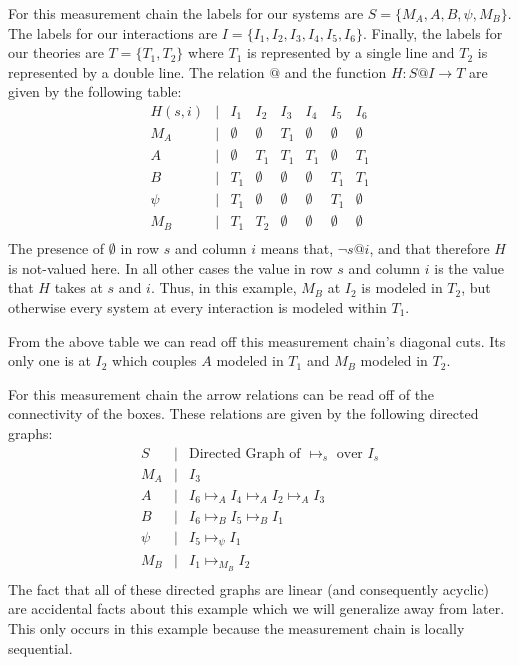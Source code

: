 \documentclass[12pt,prd,superscriptaddress,floatfix,amsmath,amssymb,amsfonts,nofootinbib]{revtex4-2}
\begin{document}
For this measurement chain the labels for our systems are $S=\{M_A,A,B,\psi,M_B\}$. The labels for our interactions are $I=\{I_1,I_2,I_3,I_4,I_5,I_6\}$. Finally, the labels for our theories are $T=\{T_1,T_2\}$ where $T_1$ is represented by a single line and $T_2$ is represented by a double line. The relation $@$ and the function $H:S@I\to T$ are given by the following table:
\[\begin{array}{cccccccc}
H(s,i) & \vert & I_1 & I_2 & I_3 & I_4 & I_5 & I_6\\
M_A & \vert & \emptyset & \emptyset & T_1 & \emptyset & \emptyset & \emptyset\\
A & \vert & \emptyset & T_1 & T_1 & T_1 & \emptyset & T_1\\
B & \vert & T_1 & \emptyset & \emptyset & \emptyset & T_1 & T_1\\
\psi & \vert & T_1 & \emptyset & \emptyset & \emptyset & T_1 & \emptyset\\
M_B & \vert & T_1 & T_2 & \emptyset & \emptyset & \emptyset & \emptyset\\
\end{array}\]
The presence of $\emptyset$ in row $s$ and column $i$ means that, $\neg s@i$, and that therefore $H$ is not-valued here. In all other cases the value in row $s$ and column $i$ is the value that $H$ takes at $s$ and $i$. Thus, in this example, $M_B$ at $I_2$ is modeled in $T_2$, but otherwise every system at every interaction is modeled within $T_1$.

From the above table we can read off this measurement chain's diagonal cuts. Its only one is at $I_2$ which couples $A$ modeled in $T_1$ and $M_B$ modeled in $T_2$.

For this measurement chain the arrow relations can be read off of the connectivity of the boxes. These relations are given by the following directed graphs:
\[\begin{array}{ccl}
S & \vert & \text{Directed Graph of }\mapsto_s\text{ over }I_s\\
M_A & \vert & I_3\\
A & \vert & I_6\mapsto_A I_4\mapsto_A I_2\mapsto_A I_3\\
B & \vert & I_6\mapsto_B I_5\mapsto_B I_1\\
\psi & \vert & I_5\mapsto_\psi I_1\\
M_B & \vert & I_1\mapsto_{M_B} I_2\\
\end{array}\]
The fact that all of these directed graphs are linear (and consequently acyclic) are accidental facts about this example which we will generalize away from later. This only occurs in this example because the measurement chain is locally sequential.
\end{document}
